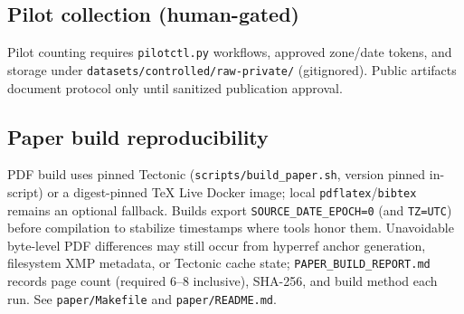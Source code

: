 \subsection{Pilot collection (human-gated)}
Pilot counting requires \texttt{pilotctl.py} workflows, approved zone/date tokens, and storage under \texttt{datasets/controlled/raw-private/} (gitignored).
Public artifacts document protocol only until sanitized publication approval.

\subsection{Paper build reproducibility}
PDF build uses pinned Tectonic (\texttt{scripts/build\_paper.sh}, version pinned in-script) or a digest-pinned TeX Live Docker image; local \texttt{pdflatex}/\texttt{bibtex} remains an optional fallback.
Builds export \texttt{SOURCE\_DATE\_EPOCH=0} (and \texttt{TZ=UTC}) before compilation to stabilize timestamps where tools honor them.
Unavoidable byte-level PDF differences may still occur from hyperref anchor generation, filesystem XMP metadata, or Tectonic cache state; \texttt{PAPER\_BUILD\_REPORT.md} records page count (required 6--8 inclusive), SHA-256, and build method each run.
See \texttt{paper/Makefile} and \texttt{paper/README.md}.
